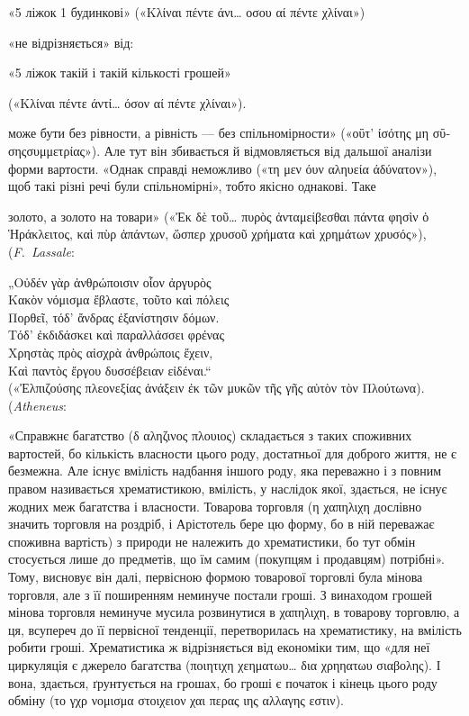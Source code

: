 \documentclass{kapital}
\begin{document}
«5 ліжок \deq{} 1 будинкові»
(«\textgreek{Κλίναι πέντε άνι\dots{} οσου αί πέντε χλίναι}»)

«не відрізняється» від:

«5 ліжок \deq{} такій і такій кількості грошей»

(«\textgreek{Κλίναι πέντε άντί\dots{} όσον αί πέντε χλίναι}»).


може бути без рівности, а рівність — без спільномірности» («\textgreek{οΰτ’ ίσότης μη σΰσηςσυμμετρίας}»). Але
тут він збивається й відмовляється від дальшої аналізи форми вартости. «Однак справді неможливо
(«\textgreek{τη μεν όυν αληυεία άδύνατον}»), щоб такі різні речі були спільномірні», тобто якісно однакові. Таке

золото, а золото на товари» («\textgreek{Ἐκ δὲ τοῦ\dots{} πυρὸς ἀνταμείβεσθαι πάντα φησὶν ὁ Ἡράκλειτος, καὶ πὺρ
ἁπάντων, ὥσπερ χρυσοῦ χρήματα καὶ χρημάτων χρυσός}»), (\emph{F.~Lassale}:

\textgreek{„Οὐδέν γὰρ ἀνθρώποισιν οἷον ἀργυρὸς \\
Κακὸν νόμισμα ἔβλαστε, τοῦτο καὶ πόλεις \\
Πορθεῖ, τόδ’ ἄνδρας ἐξανίστησιν δόμων. \\
Τόδ’ ἐκδιδάσκει καὶ παραλλάσσει φρένας \\
Χρηστὰς πρὸς αἰσχρὰ ἀνθρώποις ἔχειν, \\
Καὶ παντὸς ἔργου δυσσέβειαν εἰδέναι.“} \\


(«\textgreek{Ἐλπιζούσης  πλεονεξίας ἀνάξειν ἐκ τῶν μυκῶν τῆς γῆς αὐτὸν τὸν Πλούτωνα}). (\emph{Atheneus}:

«Справжнє багатство (\textgreek{δ αληζινος πλουιος}) складається з таких споживних
вартостей, бо кількість власности цього роду, достатньої для
доброго життя, не є безмежна. Але існує вмілість надбання іншого роду,
яка переважно і з повним правом називається хрематистикою, вмілість,
у наслідок якої, здається, не існує жодних меж багатства і власности.
Товарова торговля (\textgreek{η χαπηλιχη} дослівно значить торговля на роздріб,
і Арістотель бере цю форму, бо в ній переважає споживна вартість) з природи
не належить до хрематистики, бо тут обмін стосується лише до предметів,
що їм самим (покупцям і продавцям) потрібні». Тому, висновує
він далі, первісною формою товарової торговлі була мінова торговля,
але з її поширенням неминуче постали гроші. З винаходом грошей мінова
торговля неминуче мусила розвинутися в \textgreek{χαπηλιχη}, в товарову торговлю,
а ця, всупереч до її первісної тенденції, перетворилась на хрематистику,
на вмілість робити гроші. Хрематистика ж відрізняється від економіки
тим, що «для неї циркуляція є джерело багатства (\textgreek{ποιητιχη χεηματωυ\dots{} δια χρηηατωυ σιαβολης}). І
вона, здається, ґрунтується на грошах, бо гроші є початок і кінець цього роду обміну (\textgreek{το γχρ νομισμα
στοιχειον χαι περας ιης αλλαγης εστιν}).
\end{document}
